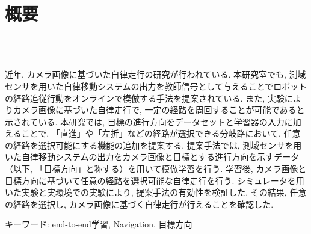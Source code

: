 \chapter*{概要}
\thispagestyle{empty}
%
\begin{center}
  \scalebox{1.5}{視覚と行動のend-to-end学習により}\\
  \scalebox{1.5}{経路追従行動をオンラインで模倣する手法の提案}\\
  \scalebox{1.5}{（目標方向による経路選択機能の追加と検証）}
\end{center}
\vspace{1.0zh}
%
近年, カメラ画像に基づいた自律走行の研究が行われている. 本研究室でも, 測域センサを用いた自律移動システムの出力を教師信号として与えることでロボットの経路追従行動をオンラインで模倣する手法を提案されている. また, 実験によりカメラ画像に基づいた自律走行で, 一定の経路を周回することが可能であると示されている. 本研究では, 目標の進行方向をデータセットと学習器の入力に加えることで, 「直進」や「左折」などの経路が選択できる分岐路において, 任意の経路を選択可能にする機能の追加を提案する. 提案手法では, 測域センサを用いた自律移動システムの出力をカメラ画像と目標とする進行方向を示すデータ（以下, 「目標方向」と称する）を用いて模倣学習を行う. 学習後, カメラ画像と目標方向に基づいて任意の経路を選択可能な自律走行を行う. シミュレータを用いた実験と実環境での実験により, 提案手法の有効性を検証した. その結果, 任意の経路を選択し, カメラ画像に基づく自律走行が行えることを確認した.

キーワード: end-to-end学習, Navigation, 目標方向
%
\newpage
